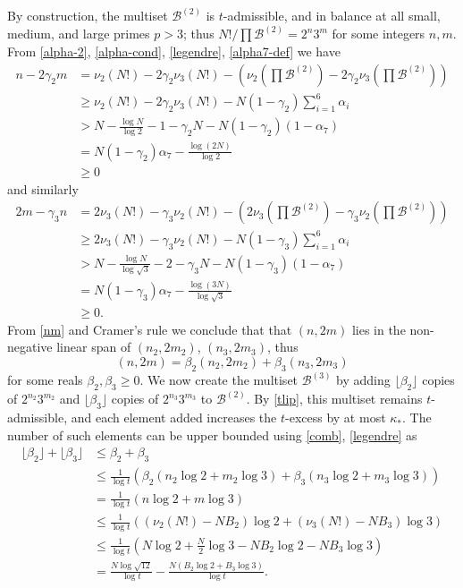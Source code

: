 \documentclass[12pt,a4paper,reqno]{amsart}
\numberwithin{equation}{section}
\theoremstyle{plain}
\theoremstyle{definition}
\newcommand\tuple{{\mathcal B}}
\begin{document}
By construction, the multiset $\tuple^{(2)}$ is $t$-admissible, and in balance at all small, medium, and large primes $p > 3$; thus $N!/\prod \tuple^{(2)} = 2^n 3^m$ for some integers $n,m$.  From \eqref{alpha-2}, \eqref{alpha-cond}, \eqref{legendre}, \eqref{alpha7-def} we have
\begin{align*}
n - 2\gamma_2 m &= \nu_2(N!) - 2\gamma_2 \nu_3(N!) - \left(\nu_2\left(\prod \tuple^{(2)}\right) - 2\gamma_2 \nu_3\left(\prod \tuple^{(2)}\right)\right) \\
&\geq \nu_2(N!) - 2\gamma_2 \nu_3(N!) - N (1-\gamma_2) \sum_{i=1}^6 \alpha_i \\
&> N - 
 \frac{\log N}{\log 2} - 1 - \gamma_2 N - N (1-\gamma_2) (1 - \alpha_7) \\
&= N (1-\gamma_2) \alpha_7 - \frac{\log(2N)}{\log 2} \\
&\geq 0
\end{align*}
and similarly
\begin{align*}
  2m - \gamma_3 n &= 2\nu_3(N!) - \gamma_3 \nu_2(N!) - \left(2\nu_3\left(\prod \tuple^{(2)}\right) - \gamma_3 \nu_2\left(\prod \tuple^{(2)}\right)\right) \\
&\geq 2\nu_3(N!) - \gamma_3 \nu_2(N!) - N (1-\gamma_3) \sum_{i=1}^6 \alpha_i \\
&> N - \frac{\log N}{\log \sqrt{3}} - 2 - \gamma_3 N - N (1-\gamma_3) (1 - \alpha_7) \\ 
&= N (1-\gamma_3) \alpha_7 - \frac{\log(3N)}{\log \sqrt{3}} \\
&\geq 0.
\end{align*}
From \eqref{nm} and Cramer's rule we conclude that that $(n,2m)$ lies in the non-negative linear span of $(n_2, 2m_2)$, $(n_3, 2m_3)$, thus
\begin{equation}\label{comb}  (n,2m) = \beta_2 (n_2,2m_2) + \beta_3 (n_3,2m_3)\end{equation}
for some reals $\beta_2,\beta_3 \geq 0$.
We now create the multiset $\tuple^{(3)}$ by adding $\lfloor \beta_2 \rfloor$ copies of $2^{n_2} 3^{m_2}$ and $\lfloor \beta_3 \rfloor$ copies of $2^{n_3} 3^{m_3}$ to $\tuple^{(2)}$.  By \eqref{tlip}, this multiset remains $t$-admissible, and each element added increases the $t$-excess by at most $\kappa_*$.  The number of such elements can be upper bounded using \eqref{comb}, \eqref{legendre} as
\begin{align*}
  \lfloor \beta_2 \rfloor + \lfloor \beta_3 \rfloor &\leq \beta_2 + \beta_3 \\
  &\leq \frac{1}{\log t} \left( \beta_2 (n_2 \log 2 + m_2 \log 3) + \beta_3 (n_3 \log 2 + m_3 \log 3) \right) \\
  &= \frac{1}{\log t} (n \log 2 + m \log 3) \\
  &\leq \frac{1}{\log t} ((\nu_2(N!)-NB_2) \log 2 + (\nu_3(N!)-NB_3) \log 3) \\
  &\leq \frac{1}{\log t} \left(N \log 2 + \frac{N}{2} \log 3 - NB_2 \log 2 - NB_3 \log 3\right) \\
  &= \frac{N \log \sqrt{12}}{\log t} - \frac{N(B_2 \log 2 + B_3 \log 3)}{\log t}.
\end{align*}
\end{document}
